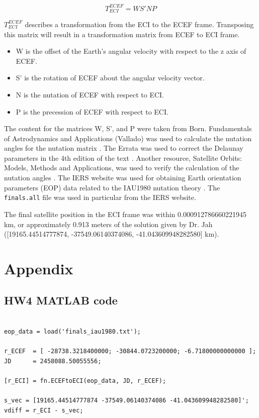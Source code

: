 \documentclass[conf]{new-aiaa}
\begin{document}
\begin{equation}
T^{ECEF}_{ECI} = W S' N P 
\end{equation} 

$T^{ECEF}_{ECI}$ describes a transformation from the ECI to the ECEF frame. Transposing this matrix will result in a transformation matrix from ECEF to ECI frame. 

\begin{itemize}
	\item W is the offset of the Earth's angular velocity with respect to the z axis of ECEF. 
	\item S' is the rotation of ECEF about the angular velocity vector. 
	\item N is the nutation of ECEF with respect to ECI. 
	\item P is the precession of ECEF with respect to ECI. 
\end{itemize}

The content for the matrices W, S', and P were taken from Born. Fundamentals of Astrodynamics and Applications (Vallado) was used to calculate the nutation angles for the nutation matrix \cite{vallado}. The Errata was used to correct the Delaunay parameters in the 4th edition of the text \cite{errata}. Another resource, Satellite Orbits: Models, Methods and Applications, was used to verify the calculation of the nutation angles \cite{sat_orbits}. The IERS website was used for obtaining Earth orientation parameters (EOP) data related to the IAU1980 nutation theory \cite{iers}. The \texttt{finals.all} file was used in particular from the IERS website. 

The final satellite position in the ECI frame was within  0.000912786660221945 km, or approximately 0.913 meters of the solution given by Dr. Jah ([19165.44514777874, -37549.06140374086, -41.043609948282580] km). 

\newpage
\section*{Appendix} 

\subsection*{HW4 MATLAB code} 

\begin{lstlisting}[basicstyle=\footnotesize]
% HW 4

eop_data = load('finals_iau1980.txt'); 

r_ECEF  = [ -28738.3218400000; -30844.0723200000; -6.71800000000000 ];
JD      = 2458088.50055556; 

[r_ECI] = fn.ECEFtoECI(eop_data, JD, r_ECEF); 

s_vec = [19165.44514777874 -37549.06140374086 -41.043609948282580]'; 
vdiff = r_ECI - s_vec; 
\end{lstlisting}
\end{document}
